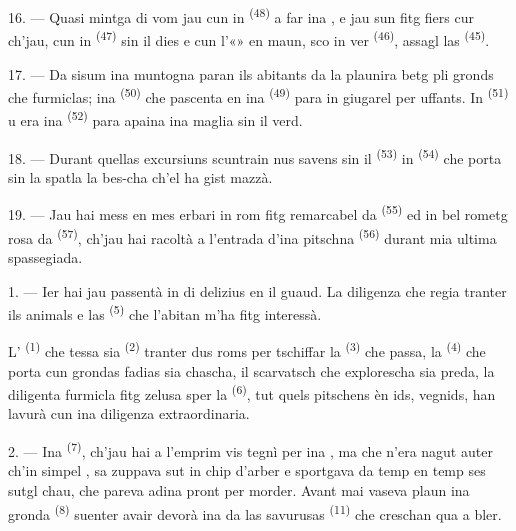 \VUsaut{3.0mm}

16. --- Quasi mintga di vom jau cun in  \textsuperscript{(48)} a far ina
, e jau sun fitg fiers cur ch'jau, cun in 
\textsuperscript{(47)} sin il dies e cun l'«» en maun, sco in ver
 \textsuperscript{(46)}, assagl las 
\textsuperscript{(45)}.

17. --- Da sisum ina muntogna paran ils abitants da la plaunira betg pli gronds che
furmiclas; ina  \textsuperscript{(50)} che pascenta en ina
 \textsuperscript{(49)} para in giugarel per uffants. In 
\textsuperscript{(51)} u era ina  \textsuperscript{(52)} para apaina
ina maglia sin il verd.

18. --- Durant quellas excursiuns scuntrain nus savens sin il 
\textsuperscript{(53)} in  \textsuperscript{(54)} che porta
sin la spatla la bes-cha ch'el ha gist mazzà.

19. --- Jau hai mess en mes erbari in rom fitg remarcabel da 
\textsuperscript{(55)} ed in bel rometg rosa da  \textsuperscript{(57)},
ch'jau hai racoltà a l'entrada d'ina pitschna  \textsuperscript{(56)}
durant mia ultima spassegiada.

\VUsaut{3.0mm}
\VUsaut{3.0mm}

\VUsaut{3.0mm}

1. --- Ier hai jau passentà in di delizius en il guaud. La diligenza che regia
tranter ils animals e las  \textsuperscript{(5)} che l'abitan m'ha fitg
interessà.

L' \textsuperscript{(1)} che tessa sia  \textsuperscript{(2)}
tranter dus roms per tschiffar la  \textsuperscript{(3)} che passa, la
 \textsuperscript{(4)} che porta cun grondas fadias sia chascha, il
scarvatsch che explorescha sia preda, la diligenta furmicla fitg zelusa sper la
 \textsuperscript{(6)}, tut quels pitschens èn ids, vegnids, han lavurà
cun ina diligenza extraordinaria.

2. --- Ina  \textsuperscript{(7)}, ch'jau hai a l'emprim vis tegnì per ina
, ma che n'era nagut auter ch'in simpel , sa zuppava sut
in chip d'arber e sportgava da temp en temp ses sutgl chau, che pareva adina pront
per morder. Avant mai vaseva plaun ina gronda  \textsuperscript{(8)}
suenter avair devorà ina da las savurusas  \textsuperscript{(11)} che
creschan qua a bler.

